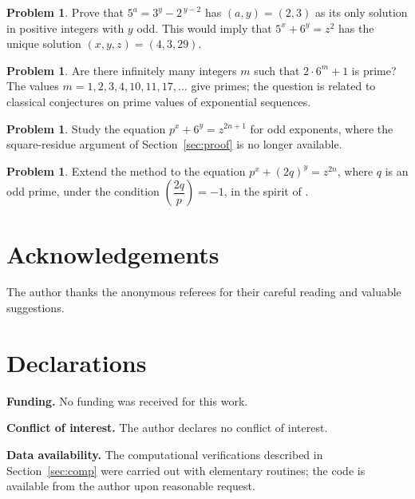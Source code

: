 \documentclass[preprint,12pt]{elsarticle}
\theoremstyle{definition}
\newtheorem{problem}[theorem]{Problem}
\newcommand{\leg}[2]{\left(\dfrac{#1}{#2}\right)}
\begin{document}
\begin{problem}\label{prob:five}
Prove that $5^{a}=3^{y}-2^{\,y-2}$ has $(a,y)=(2,3)$ as its only solution in
positive integers with $y$ odd. This would imply that $5^{x}+6^{y}=z^{2}$
has the unique solution $(x,y,z)=(4,3,29)$.
\end{problem}

\begin{problem}\label{prob:infinitude}
Are there infinitely many integers $m$ such that $2\cdot 6^{m}+1$ is prime?
The values $m=1,2,3,4,10,11,17,\dots$ give primes; the question is related to
classical conjectures on prime values of exponential sequences.
\end{problem}

\begin{problem}\label{prob:odd}
Study the equation $p^{x}+6^{y}=z^{2n+1}$ for odd exponents, where the
square-residue argument of Section~\ref{sec:proof} is no longer available.
\end{problem}

\begin{problem}\label{prob:general}
Extend the method to the equation $p^{x}+(2q)^{y}=z^{2n}$, where $q$ is an
odd prime, under the condition $\leg{2q}{p}=-1$, in the spirit of
\cite{MinaBacani2019,PakapongpunChattae2022,TadeeThaneepoon2023}.
\end{problem}

\section*{Acknowledgements}

The author thanks the anonymous referees for their careful reading and
valuable suggestions.

\section*{Declarations}

\textbf{Funding.} No funding was received for this work.
\smallskip

\textbf{Conflict of interest.} The author declares no conflict of interest.
\smallskip

\textbf{Data availability.} The computational verifications described in
Section~\ref{sec:comp} were carried out with elementary routines; the code is
available from the author upon reasonable request.
\end{document}
